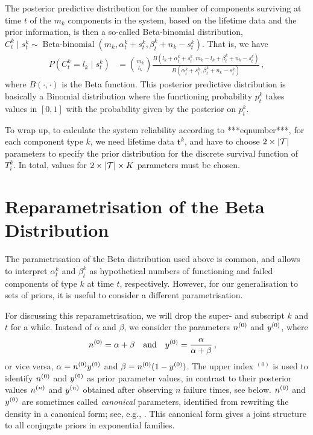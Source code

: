 \documentclass[authoryear, 12pt, a4paper]{elsarticle}
\newcommand{\bs}[1]{\boldsymbol{#1}}
\renewcommand{\vec}[1]{{\bs#1}}
\newcommand{\uz}{^{(0)}} %
\newcommand{\bebin}{\operatorname{Beta-binomial}}
\newcommand{\ptk}{p^k_t}
\begin{document}
The posterior predictive distribution for the number of components surviving at time $t$
of the $m_k$ components in the system, based on the lifetime data and the prior information,
is then a so-called Beta-binomial distribution,
$C^k_t \mid s^k_t \sim \bebin(m_k, \alpha^k_t + s^k_t, \beta^k_t + n_k - s^k_t)$.
That is, we have
\begin{align*}
P(C^k_t = l_k \mid s^k_t) &= {m_k \choose l_k} \frac{B(l_k + \alpha^k_t + s^k_t, m_k - l_k + \beta^k_t + n_k - s^k_t)}
                                                    {B(\alpha^k_t + s^k_t, \beta^k_t + n_k - s^k_t)} \,,
\end{align*}
where $B(\cdot, \cdot)$ is the Beta function.
This posterior predictive distribution is basically a Binomial distribution
where the functioning probability $\ptk$ takes values in $[0,1]$
with the probability given by the posterior on $\ptk$.

To wrap up, to calculate the system reliability according to ***eqnumber***,
for each component type $k$,
we need lifetime data $\vec{t}^k$,
and have to choose $2 \times |{\cal T}|$ parameters
to specify the prior distribution for the discrete survival function of $T^k_i$.
In total, values for $2 \times |{\cal T}| \times K$ parameters must be chosen.


\section{Reparametrisation of the Beta Distribution}

The parametrisation of the Beta distribution used above is common,
and allows to interpret $\alpha^k_t$ and $\beta^k_t$ as
hypothetical numbers of functioning and failed components of type $k$ at time $t$, respectively.
However, for our generalisation to sets of priors,
it is useful to consider a different parametrisation.

For discussing this reparametrisation, we will drop the super- and subscript $k$ and $t$ for a while.
Instead of $\alpha$ and $\beta$, we consider the parameters $\nz$ and $\yz$, where
\begin{align}
\nz &= \alpha + \beta &
&\text{and} &
\yz &= \frac{\alpha}{\alpha + \beta} \,,
\label{eq:reparam}
\end{align}
or vice versa, $\alpha = \nz\yz$ and $\beta = \nz(1-\yz)$.
The upper index ${}\uz$ is used to identify $\nz$ and $\yz$ as prior parameter values,
in contrast to their posterior values $n^{(n)}$ and $y^{(n)}$
obtained after observing $n$ failure times, see below.
$\nz$ and $\yz$ are sometimes called \emph{canonical} parameters,
identified from rewriting the density in a canonical form;
see, e.g., \citet[pp.~202 and 272f]{2000:bernardosmith}.
This canonical form gives a joint structure to all conjugate priors in exponential families.
\end{document}
